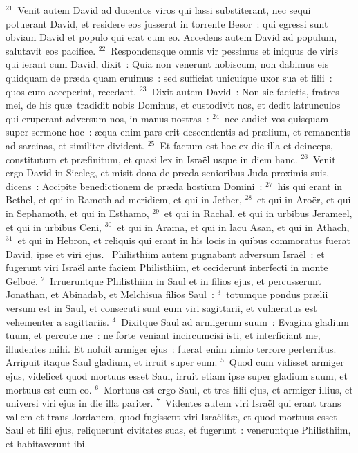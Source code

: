 ${}^{21}$~Venit autem David ad ducentos viros qui lassi substiterant, nec sequi potuerant David, et residere eos jusserat in torrente Besor~: qui egressi sunt obviam David et populo qui erat cum eo. Accedens autem David ad populum, salutavit eos pacifice.
${}^{22}$~Respondensque omnis vir pessimus et iniquus de viris qui ierant cum David, dixit~: Quia non venerunt nobiscum, non dabimus eis quidquam de pr\ae da quam eruimus~: sed sufficiat unicuique uxor sua et filii~: quos cum acceperint, recedant.
${}^{23}$~Dixit autem David~: Non sic facietis, fratres mei, de his qu\ae\ tradidit nobis Dominus, et custodivit nos, et dedit latrunculos qui eruperant adversum nos, in manus nostras~:
${}^{24}$~nec audiet vos quisquam super sermone hoc~: \ae qua enim pars erit descendentis ad pr\ae lium, et remanentis ad sarcinas, et similiter divident.
${}^{25}$~Et factum est hoc ex die illa et deinceps, constitutum et pr\ae finitum, et quasi lex in Isra\"el usque in diem hanc.
${}^{26}$~Venit ergo David in Siceleg, et misit dona de pr\ae da senioribus Juda proximis suis, dicens~: Accipite benedictionem de pr\ae da hostium Domini~:
${}^{27}$~his qui erant in Bethel, et qui in Ramoth ad meridiem, et qui in Jether,
${}^{28}$~et qui in Aro\"er, et qui in Sephamoth, et qui in Esthamo,
${}^{29}$~et qui in Rachal, et qui in urbibus Jerameel, et qui in urbibus Ceni,
${}^{30}$~et qui in Arama, et qui in lacu Asan, et qui in Athach,
${}^{31}$~et qui in Hebron, et reliquis qui erant in his locis in quibus commoratus fuerat David, ipse et viri ejus.
~\lettrine[lines=10,image=true,loversize=0.05,lraise=-0.03]{P}{}hilisthiim autem pugnabant adversum Isra\"el~: et fugerunt viri Isra\"el ante faciem Philisthiim, et ceciderunt interfecti in monte Gelbo\"e.
${}^{2}$~Irrueruntque Philisthiim in Saul et in filios ejus, et percusserunt Jonathan, et Abinadab, et Melchisua filios Saul~:
${}^{3}$~totumque pondus pr\ae lii versum est in Saul, et consecuti sunt eum viri sagittarii, et vulneratus est vehementer a sagittariis.
${}^{4}$~Dixitque Saul ad armigerum suum~: Evagina gladium tuum, et percute me~: ne forte veniant incircumcisi isti, et interficiant me, illudentes mihi. Et noluit armiger ejus~: fuerat enim nimio terrore perterritus. Arripuit itaque Saul gladium, et irruit super eum.
${}^{5}$~Quod cum vidisset armiger ejus, videlicet quod mortuus esset Saul, irruit etiam ipse super gladium suum, et mortuus est cum eo.
${}^{6}$~Mortuus est ergo Saul, et tres filii ejus, et armiger illius, et universi viri ejus in die illa pariter.
${}^{7}$~Videntes autem viri Isra\"el qui erant trans vallem et trans Jordanem, quod fugissent viri Isra\"elit\ae , et quod mortuus esset Saul et filii ejus, reliquerunt civitates suas, et fugerunt~: veneruntque Philisthiim, et habitaverunt ibi.
